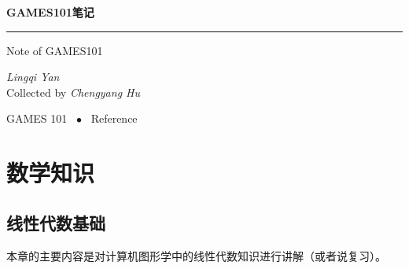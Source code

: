 \documentclass[openany]{progbookcn}
\begin{document}
	



\begin{titlepage}
  \vspace*{25ex}

  \hspace{0.05\textwidth}\begin{minipage}{.9\textwidth}
    \flushright

    {\textbf{GAMES101笔记}}

    \rule{\linewidth}{.5pt}

    \vspace{2ex}

    {\textsf{Note of GAMES101}} \\

    \vspace{20ex}

    { \textit{Lingqi Yan} \\Collected by \textit{Chengyang Hu}}
  \end{minipage}

  \vfill

  \centering
  {GAMES 101 ~$\bullet$ ~Reference}
\end{titlepage}
\thispagestyle{empty}


\frontmatter








\clearpage
{
  \hypersetup{hidelinks}
  \tableofcontents
}


\mainmatter

\part{数学知识}

\chapter{线性代数基础}

本章的主要内容是对计算机图形学中的线性代数知识进行讲解（或者说复习）。
\end{document}
